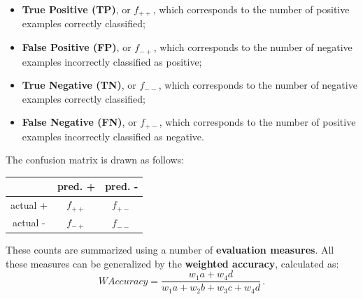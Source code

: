 \begin{itemize}
    \item \textbf{True Positive (TP)}, or $f_{++}$, which corresponds to the number of positive examples correctly classified;

    \item \textbf{False Positive (FP)}, or $f_{-+}$, which corresponds to the number of negative examples incorrectly classified as positive;

    \item \textbf{True Negative (TN)}, or $f_{--}$, which corresponds to the number of negative examples correctly classified;

    \item \textbf{False Negative (FN)}, or $f_{+-}$, which corresponds to the number of positive examples incorrectly classified as negative.
\end{itemize}

The confusion matrix is drawn as follows:

\begin{table}[h]
    \centering
    \begin{tabular}{|c|c|c|}
         \hline
         & pred. + & pred. - \\
        \hline
        actual + & $f_{++}$ & $f_{+-}$\\
        \hline
        actual - & $f_{-+}$ & $f_{--}$\\
        \hline
    \end{tabular}
\end{table}

These counts are summarized using a number of \textbf{evaluation measures}.
All these measures can be generalized by the \textbf{weighted accuracy}, calculated as:
\begin{equation*}
    WAccuracy = \dfrac{w_1a + w_4d}{w_1a + w_2b + w_3c + w_4d} \, .
\end{equation*}

